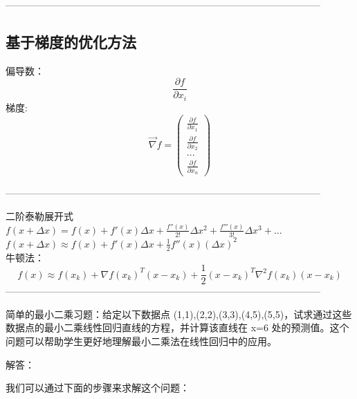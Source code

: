 \documentclass{article}
\begin{document}
--------------------------------------------------------------------------------------------------
\subsection{基于梯度的优化方法}
偏导数：
$$\frac{\partial f}{\partial x_i}$$
梯度:
$$\vec{\nabla}f=\begin{pmatrix}\frac{\partial f}{\partial x_1} \\ \frac{\partial f}{\partial x_2} \\ ... \\ \frac{\partial f}{\partial x_n} \end{pmatrix}$$



--------------------------------------------------------------------------------------------------

二阶泰勒展开式  \\
$ f(x + \Delta x) = f(x) + f'(x)\Delta x + \frac{f''(x)}{2!}\Delta x^2 + \frac{f'''(x)}{3!}\Delta x^3 + ... $ \\

$ f(x+\Delta x) \approx f(x) + f'(x)\Delta x + \frac{1}{2}f''(x)(\Delta x)^2 $ \\

牛顿法：
$$f(x)\approx f(x_k)+\nabla f(x_k)^T(x-x_k)+\frac{1}{2}(x-x_k)^T\nabla^2f(x_k)(x-x_k)$$
--------------------------------------------------------------------------------------------------

简单的最小二乘习题：给定以下数据点 (1,1),(2,2),(3,3),(4,5),(5,5)，试求通过这些数据点的最小二乘线性回归直线的方程，并计算该直线在 x=6 处的预测值。这个问题可以帮助学生更好地理解最小二乘法在线性回归中的应用。

解答：

我们可以通过下面的步骤来求解这个问题：
\end{document}
